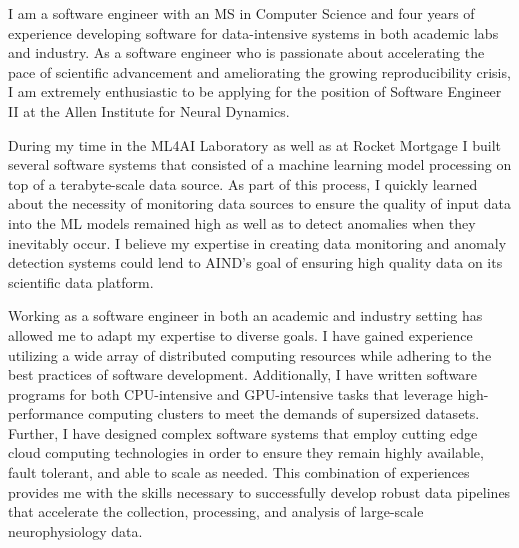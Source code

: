 

I am a software engineer with an MS in Computer Science and four years of experience developing software for data-intensive systems in both academic labs and industry.
As a software engineer who is passionate about accelerating the pace of scientific advancement and ameliorating the growing reproducibility crisis, I am extremely enthusiastic to be applying for the position of Software Engineer II at the Allen Institute for Neural Dynamics.

During my time in the ML4AI Laboratory as well as at Rocket Mortgage I built several software systems that consisted of a machine learning model processing on top of a terabyte-scale data source.
As part of this process, I quickly learned about the necessity of monitoring data sources to ensure the quality of input data into the ML models remained high as well as to detect anomalies when they inevitably occur.
I believe my expertise in creating data monitoring and anomaly detection systems could lend to AIND's goal of ensuring high quality data on its scientific data platform.

Working as a software engineer in both an academic and industry setting has allowed me to adapt my expertise to diverse goals.
I have gained experience utilizing a wide array of distributed computing resources while adhering to the best practices of software development.
Additionally, I have written software programs for both CPU-intensive and GPU-intensive tasks that leverage high-performance computing clusters to meet the demands of supersized datasets.
Further, I have designed complex software systems that employ cutting edge cloud computing technologies in order to ensure they remain highly available, fault tolerant, and able to scale as needed.
This combination of experiences provides me with the skills necessary to successfully develop robust data pipelines that accelerate the collection, processing, and analysis of large-scale neurophysiology data.

